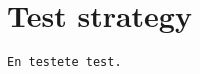 \chapter{Test strategy}

\begin{lstlisting}[caption = The console output, label = lis:consOutput]
En testete test.
\end{lstlisting}
